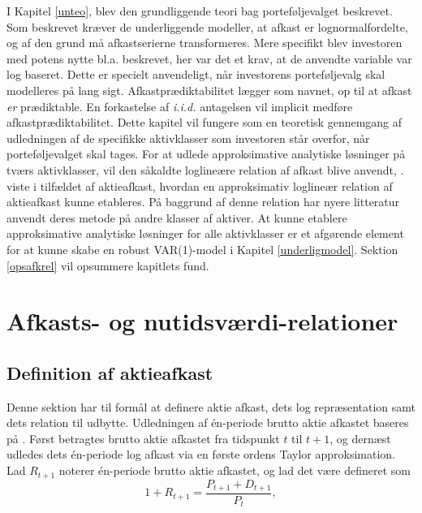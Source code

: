 \documentclass[
  a4paper,
  oneside]{memoir}
\begin{document}
I Kapitel \ref{unteo}, blev den grundliggende teori bag porteføljevalget beskrevet. Som beskrevet kræver de underliggende modeller, at afkast er lognormalfordelte, og af den grund må afkastserierne transformeres. Mere specifikt blev investoren med potens nytte bl.a. beskrevet, her var det et krav, at de anvendte variable var log baseret. Dette er specielt anvendeligt, når investorens porteføljevalg skal modelleres på lang sigt. Afkastprædiktabilitet lægger som navnet, op til at afkast \emph{er} prædiktable. En forkastelse af \emph{i.i.d.} antagelsen vil implicit medføre afkastprædiktabilitet. Dette kapitel vil fungere som en teoretisk gennemgang af udledningen af de specifikke aktivklasser som investoren står overfor, når porteføljevalget skal tages. For at udlede approksimative analytiske løsninger på tværs aktivklasser, vil den såkaldte loglineære relation af afkast blive anvendt, \citep{Campbell1988}. \citep{Campbell1988} viste i tilfældet af aktieafkast, hvordan en approksimativ loglineær relation af aktieafkast kunne etableres. På baggrund af denne relation har nyere litteratur anvendt deres metode på andre klasser af aktiver. At kunne etablere approksimative analytiske løsninger for alle aktivklasser er et afgørende element for at kunne skabe en robust VAR(1)-model i Kapitel \ref{underligmodel}. Sektion \ref{opsafkrel} vil opsummere kapitlets fund.

\hypertarget{afkognut}{%
\section{Afkasts- og nutidsværdi-relationer}\label{afkognut}}

\hypertarget{defaktafk}{%
\subsection{Definition af aktieafkast}\label{defaktafk}}

Denne sektion har til formål at definere aktie afkast, dets log repræsentation samt dets relation til udbytte. Udledningen af én-periode brutto aktie afkastet baseres på \citep{Campbell1988}. Først betragtes brutto aktie afkastet fra tidspunkt \(t\) til \(t+1\), og dernæst udledes dets én-periode log afkast via en første ordens Taylor approksimation. Lad \(R_{t+1}\) noterer én-periode brutto aktie afkastet, og lad det være defineret som
\begin{equation}
1+R_{t+1}=\frac{P_{t+1}+D_{t+1}}{P_t}, \label{eq:csaa}
\end{equation}
\end{document}
